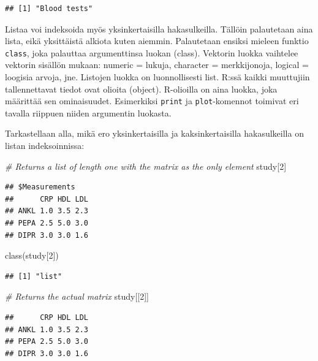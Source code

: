 \documentclass[
]{book}
\newenvironment{Shaded}{\begin{snugshade}}{\end{snugshade}}
\newcommand{\CommentTok}[1]{\textcolor[rgb]{0.56,0.35,0.01}{\textit{#1}}}
\newcommand{\DecValTok}[1]{\textcolor[rgb]{0.00,0.00,0.81}{#1}}
\newcommand{\FunctionTok}[1]{\textcolor[rgb]{0.00,0.00,0.00}{#1}}
\newcommand{\NormalTok}[1]{#1}
\begin{document}
\begin{verbatim}
## [1] "Blood tests"
\end{verbatim}

Listaa voi indeksoida myös yksinkertaisilla hakasulkeilla. Tällöin palautetaan aina lista, eikä yksittäistä alkiota kuten aiemmin. Palautetaan ensiksi mieleen funktio \texttt{class}, joka palauttaa argumenttinsa luokan (class). Vektorin luokka vaihtelee vektorin sisällön mukaan: numeric = lukuja, character = merkkijonoja, logical = loogisia arvoja, jne. Listojen luokka on luonnollisesti list. R:ssä kaikki muuttujiin tallennettavat tiedot ovat olioita (object). R-olioilla on aina luokka, joka määrittää sen ominaisuudet. Esimerkiksi \texttt{print} ja \texttt{plot}-komennot toimivat eri tavalla riippuen niiden argumentin luokasta.

Tarkastellaan alla, mikä ero yksinkertaisilla ja kaksinkertaisilla hakasulkeilla on listan indeksoinnissa:

\begin{Shaded}
\begin{Highlighting}[]
\CommentTok{\# Returns a list of length one with the matrix as the only element}
\NormalTok{study[}\DecValTok{2}\NormalTok{]}
\end{Highlighting}
\end{Shaded}

\begin{verbatim}
## $Measurements
##      CRP HDL LDL
## ANKL 1.0 3.5 2.3
## PEPA 2.5 5.0 3.0
## DIPR 3.0 3.0 1.6
\end{verbatim}

\begin{Shaded}
\begin{Highlighting}[]
\FunctionTok{class}\NormalTok{(study[}\DecValTok{2}\NormalTok{])}
\end{Highlighting}
\end{Shaded}

\begin{verbatim}
## [1] "list"
\end{verbatim}

\begin{Shaded}
\begin{Highlighting}[]
\CommentTok{\# Returns the actual matrix}
\NormalTok{study[[}\DecValTok{2}\NormalTok{]]}
\end{Highlighting}
\end{Shaded}

\begin{verbatim}
##      CRP HDL LDL
## ANKL 1.0 3.5 2.3
## PEPA 2.5 5.0 3.0
## DIPR 3.0 3.0 1.6
\end{verbatim}
\end{document}
